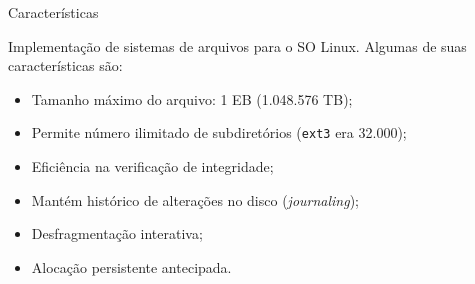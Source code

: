 
\begin{frame}{\insertlecture}{Características}

  Implementação de sistemas de arquivos para o SO Linux. Algumas de
  suas características são:

  \begin{itemize}
  \item Tamanho máximo do arquivo: 1 EB (1.048.576 TB);
  \item Permite número ilimitado de subdiretórios ({\tt ext3} era 32.000);
  \item Eficiência na verificação de integridade;
  \item Mantém histórico de alterações no disco ({\em journaling});
  \item Desfragmentação interativa;
  \item Alocação persistente antecipada.
  \end{itemize}

\end{frame}